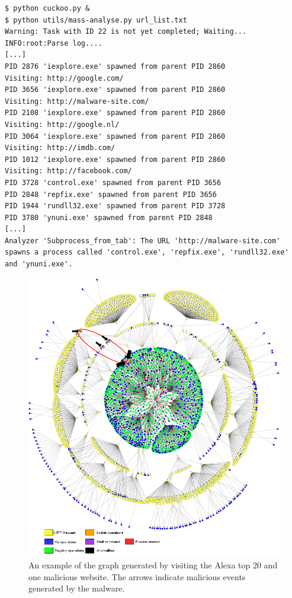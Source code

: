 \begin{lstlisting}[caption={Mass analyzer being run},label={code:run}]
$ python cuckoo.py &
$ python utils/mass-analyse.py url_list.txt
Warning: Task with ID 22 is not yet completed; Waiting...
INFO:root:Parse log....
[...]
PID 2876 'iexplore.exe' spawned from parent PID 2860
Visiting: http://google.com/
PID 3656 'iexplore.exe' spawned from parent PID 2860
Visiting: http://malware-site.com/
PID 2108 'iexplore.exe' spawned from parent PID 2860
Visiting: http://google.nl/
PID 3064 'iexplore.exe' spawned from parent PID 2860
Visiting: http://imdb.com/
PID 1012 'iexplore.exe' spawned from parent PID 2860
Visiting: http://facebook.com/
PID 3728 'control.exe' spawned from parent PID 3656
PID 2848 'repfix.exe' spawned from parent PID 3656
PID 1944 'rundll32.exe' spawned from parent PID 3728
PID 3780 'ynuni.exe' spawned from parent PID 2848
[...]
Analyzer 'Subprocess_from_tab': The URL 'http://malware-site.com' spawns a process called 'control.exe', 'repfix.exe', 'rundll32.exe' and 'ynuni.exe'.
\end{lstlisting}

\pagebreak

\begin{figure}[h]
    \centering
    \centerline{\includegraphics[width=20cm]{Images/graph4.jpg}}
    \caption{An example of the graph generated by visiting the Alexa top 20 and one malicious website. The arrows indicate malicious events generated by the malware.}
    \label{fig:graph}
\end{figure}

